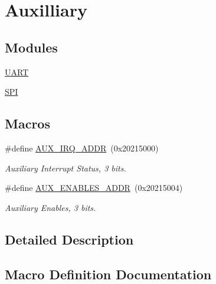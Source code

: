 \hypertarget{group__Auxilliary}{}\section{Auxilliary}
\label{group__Auxilliary}
\subsection*{Modules}
\begin{DoxyCompactItemize}
\item 
\hyperlink{group__UART}{U\+A\+RT}
\item 
\hyperlink{group__SPI}{S\+PI}
\end{DoxyCompactItemize}
\subsection*{Macros}
\begin{DoxyCompactItemize}
\item 
\#define \hyperlink{group__Auxilliary_ga639b2045d2c60d72ba8e023bcdcf32a1}{A\+U\+X\+\_\+\+I\+R\+Q\+\_\+\+A\+D\+DR}~(0x20215000)
\begin{DoxyCompactList}\small\item\em Auxiliary Interrupt Status, 3 bits. \end{DoxyCompactList}\item 
\#define \hyperlink{group__Auxilliary_gab0a21230d9d57f4131ce59a3c610593f}{A\+U\+X\+\_\+\+E\+N\+A\+B\+L\+E\+S\+\_\+\+A\+D\+DR}~(0x20215004)
\begin{DoxyCompactList}\small\item\em Auxiliary Enables, 3 bits. \end{DoxyCompactList}\end{DoxyCompactItemize}


\subsection{Detailed Description}


\subsection{Macro Definition Documentation}
\mbox{\label{group__Auxilliary_gab0a21230d9d57f4131ce59a3c610593f}} 
